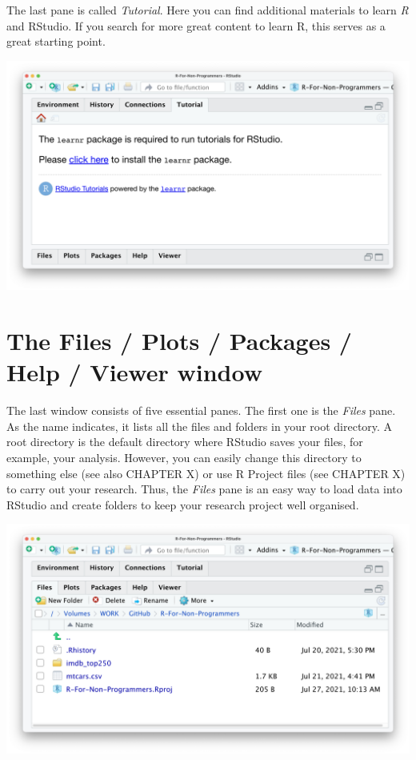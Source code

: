 \documentclass[
]{book}
\begin{document}
The last pane is called \emph{Tutorial}. Here you can find additional materials to learn \emph{R} and RStudio. If you search for more great content to learn R, this serves as a great starting point.

\includegraphics{images/chapter_04_img/04_environment_history_etc/04_rstudio_tutorial.png}

\hypertarget{the-files-plots-packages-help-viewer-window}{%
\section{The Files / Plots / Packages / Help / Viewer window}\label{the-files-plots-packages-help-viewer-window}}

The last window consists of five essential panes. The first one is the \emph{Files} pane. As the name indicates, it lists all the files and folders in your root directory. A root directory is the default directory where RStudio saves your files, for example, your analysis. However, you can easily change this directory to something else (see also CHAPTER X) or use R Project files (see CHAPTER X) to carry out your research. Thus, the \emph{Files} pane is an easy way to load data into RStudio and create folders to keep your research project well organised.

\includegraphics{images/chapter_04_img/05_files_plots_etc/01_rstudio_files.png}
\end{document}
